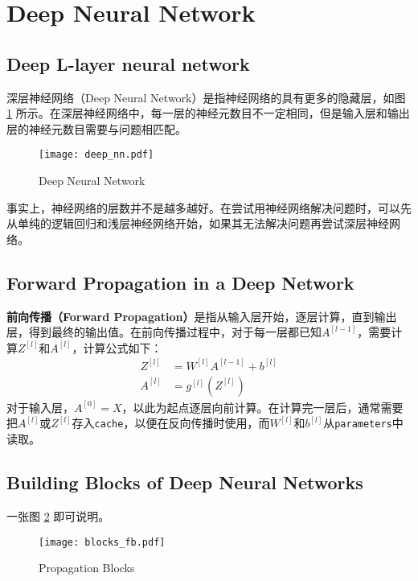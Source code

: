 \section{Deep Neural Network}

\subsection{Deep L-layer neural network}
深层神经网络（Deep Neural Network）是指神经网络的具有更多的隐藏层，如图 \ref{fig:deep_nn} 所示。在深层神经网络中，每一层的神经元数目不一定相同，但是输入层和输出层的神经元数目需要与问题相匹配。
\begin{figure}[h!bt]
    \centering
    \texttt{[image: deep\_nn.pdf]}
    \caption[Deep Neural Network]{Deep Neural Network\setcounter{footnote}{0}\footnotemark}
    \label{fig:deep_nn}
\end{figure}

事实上，神经网络的层数并不是越多越好。在尝试用神经网络解决问题时，可以先从单纯的逻辑回归和浅层神经网络开始，如果其无法解决问题再尝试深层神经网络。

\subsection{Forward Propagation in a Deep Network}
\textbf{前向传播（Forward Propagation）}是指从输入层开始，逐层计算，直到输出层，得到最终的输出值。在前向传播过程中，对于每一层都已知$A^{[l-1]}$，需要计算$Z^{[l]}$和$A^{[l]}$，计算公式如下：
\begin{align}
	Z^{[l]} &= W^{[l]} A^{[l-1]} + b^{[l]} \\
	A^{[l]} &= g^{[l]}(Z^{[l]})
\end{align}
对于输入层，$A^{[0]} = X$，以此为起点逐层向前计算。在计算完一层后，通常需要把$A^{[l]}$或$Z^{[l]}$存入\;\verb|cache|，以便在反向传播时使用，而$W^{[l]}$和$b^{[l]}$从\;\verb|parameters|\;中读取。

\subsection{Building Blocks of Deep Neural Networks}
一张图 \ref{fig:blocks_fb} 即可说明。
\begin{figure}[h!b]
    \centering
    \texttt{[image: blocks\_fb.pdf]}
    \caption{Propagation Blocks}
    \label{fig:blocks_fb}
\end{figure}

